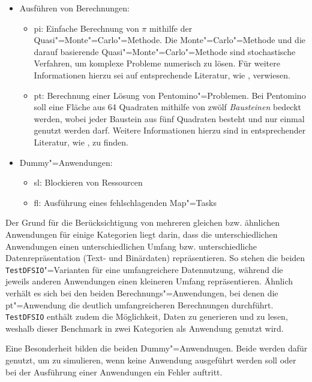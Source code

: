 \begin{itemize}
    \item Ausführen von Berechnungen:
    \begin{itemize}
        \item \acrlong{pi}: Einfache Berechnung von $\pi$ mithilfe der Quasi"=Monte"=Carlo"=Methode.
            Die Monte"=Carlo"=Methode und die darauf basierende Quasi"=Monte"=Carlo"=Methode sind stochastische Verfahren, um komplexe Probleme numerisch zu lösen.
            Für weitere Informationen hierzu sei auf entsprechende Literatur, wie \zB \cite{Korn2010,Lemieux2009}, verwiesen.
        \item \gls{pt}: Berechnung einer Lösung von Pentomino"=Problemen.
            Bei Pentomino soll eine Fläche aus 64 Quadraten mithilfe von zwölf \emph{Bausteinen} bedeckt werden, wobei jeder Baustein aus fünf Quadraten besteht und nur einmal genutzt werden darf.
            Weitere Informationen hierzu sind in entsprechender Literatur, wie \zB \cite{Golomb1995}, zu finden.
    \end{itemize}

    \item Dummy"=Anwendungen:
    \begin{itemize}
        \item \gls{sl}: Blockieren von Ressourcen
        \item \gls{fl}: Ausführung eines fehlschlagenden Map"=Tasks
    \end{itemize}
\end{itemize}

Der Grund für die Berücksichtigung von mehreren gleichen bzw. ähnlichen Anwendungen für einige Kategorien liegt darin, dass die unterschiedlichen Anwendungen einen unterschiedlichen Umfang bzw. unterschiedliche Datenrepräsentation (Text- und Binärdaten) repräsentieren.
So stehen die beiden \texttt{TestDFSIO}"=Varianten für eine umfangreichere Datennutzung, während die jeweils anderen Anwendungen einen kleineren Umfang repräsentieren.
Ähnlich verhält es sich bei den beiden Berechnungs"=Anwendungen, bei denen die \acrlong{pt}"=Anwendung die deutlich umfangreicheren Berechnungen durchführt.
\texttt{TestDFSIO} enthält zudem die Möglichkeit, Daten zu generieren und zu lesen, weshalb dieser Benchmark in zwei Kategorien als Anwendung genutzt wird.

Eine Besonderheit bilden die beiden Dummy"=Anwendnugen.
Beide werden dafür genutzt, um zu simulieren, wenn keine Anwendung ausgeführt werden soll oder bei der Ausführung einer Anwendungen ein Fehler auftritt.

